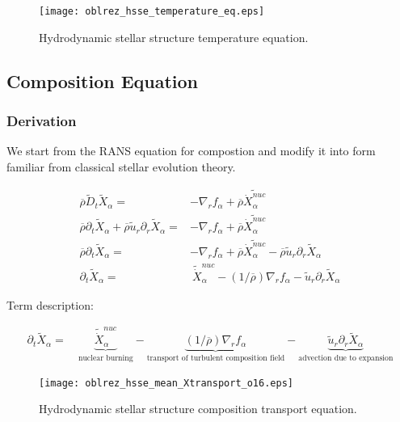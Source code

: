 \documentclass[10pt,paper=a4]{report}
\newcommand{\eht}{\overline}
\newcommand{\fht}{\widetilde}
\begin{document}
\begin{figure}[!h]
\centerline{
  \texttt{[image: oblrez\_hsse\_temperature\_eq.eps]}}
\caption{Hydrodynamic stellar structure temperature equation.}
\end{figure}

\newpage

\subsection{Composition Equation}

\subsubsection{Derivation}

We start from the RANS equation for compostion and modify it into form familiar from classical stellar evolution theory.

\begin{align}
\eht{\rho} \fht{D}_t \fht{X}_\alpha = & -\nabla_r f_\alpha + \eht{\rho}\fht{\dot{X}_\alpha^{nuc}} \nonumber \\
\eht{\rho} \partial_t \fht{X}_\alpha + \eht{\rho}\fht{u}_r \partial_r \fht{X}_\alpha = & -\nabla_r f_\alpha + \eht{\rho}\fht{\dot{X}_\alpha^{nuc}}  \nonumber \\
\eht{\rho} \partial_t \fht{X}_\alpha = & -\nabla_r f_\alpha + \eht{\rho}\fht{\dot{X}_\alpha^{nuc}} - \eht{\rho}\fht{u}_r \partial_r \fht{X}_\alpha  \nonumber \\
\partial_t \fht{X}_\alpha = & \ \fht{\dot{X}}_\alpha^{nuc} -(1/\eht{\rho}) \nabla_r f_\alpha - \fht{u}_r \partial_r \fht{X}_\alpha \nonumber
\end{align}

\noindent
Term description:

\begin{align}
\partial_t \fht{X}_\alpha = & \ \underbrace{\fht{\dot{X}}_\alpha^{nuc}}_\text{nuclear burning} - \underbrace{(1/\eht{\rho}) \nabla_r f_\alpha}_\text{transport of turbulent composition field} -\underbrace{\fht{u}_r \partial_r \fht{X}_\alpha}_\text{advection due to expansion} 
\end{align}

\begin{figure}[!h]
\centerline{
  \texttt{[image: oblrez\_hsse\_mean\_Xtransport\_o16.eps]}}
\caption{Hydrodynamic stellar structure composition transport equation.}
\end{figure}
\end{document}
